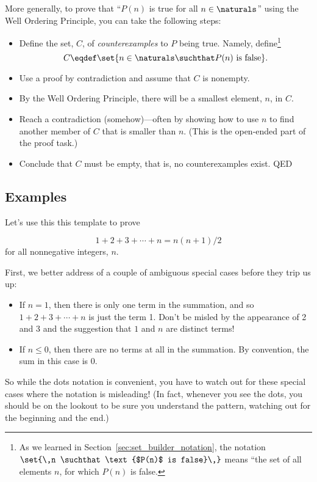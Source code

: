 More generally, to prove that ``$P(n)$ is true for all
$n\in \naturals$'' using the Well Ordering Principle, you can take the
following steps:
\begin{itemize}

\item Define the set, $C$, of \emph{counterexamples} to $P$ being
  true.  Namely, define\footnote{As we learned in
    Section~\ref{sec:set_builder_notation}, the notation 
    $\set{\,n \suchthat \text{$P(n)$ is false}\,}$
    means ``the set of all elements $n$, for which $P(n)$ is false.}
\[
C \eqdef \set{n\in\naturals \suchthat P(n) \text{ is false}}.
\]

\item Use a proof by contradiction and assume that $C$ is nonempty.

\item By the Well Ordering Principle, there will be a smallest
      element, $n$, in $C$.

\item Reach a contradiction (somehow)---often by showing how to use $n$
to find another member of $C$ that is smaller than $n$.  (This is the
open-ended part of the proof task.)

\item Conclude that $C$ must be empty, that is, no counterexamples exist.
QED

\end{itemize}


\subsection{Examples}

Let's use this this template to prove %

\begin{theorem*}  %
\begin{equation}\label{sum1n}
1 + 2 + 3 + \cdots + n = n(n+1)/2
\end{equation}
for all nonnegative integers, $n$.
\end{theorem*}

First, we better address of a couple of ambiguous special
cases before they trip us up:
%
\begin{itemize}
%
\item If $n = 1$, then there is only one term in the summation, and so $1
  + 2 + 3 + \cdots + n$ is just the term 1.  Don't be misled by the
  appearance of 2 and 3 and the suggestion that $1$ and $n$ are distinct
  terms!
%
\item If $n \leq 0$, then there are no terms at all in the summation.  By
convention, the sum in this case is 0.
%
\end{itemize}
%
So while the dots notation is convenient, you have to watch out for these
special cases where the notation is misleading!  (In fact, whenever you
see the dots, you should be on the lookout to be sure you understand the
pattern, watching out for the beginning and the end.)


